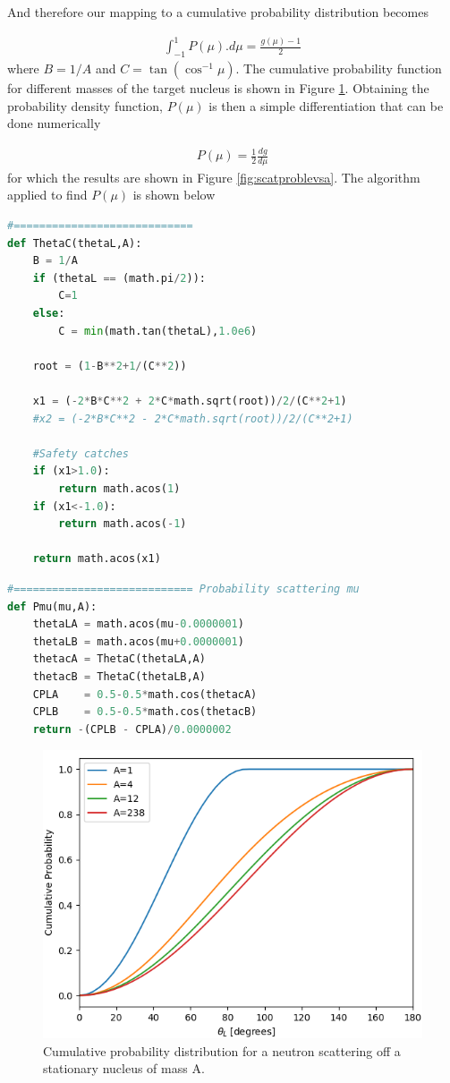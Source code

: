 \documentclass[11pt,letterpaper,titlepage]{article}
\newcommand{\beqn}{\begin{equation}
	\begin{aligned}}
\newcommand{\eeqn}{\end{aligned}
	\end{equation}}
\numberwithin{equation}{section}
\begin{document}
\begin{appendices}
 And therefore our mapping to a cumulative probability distribution becomes
 
 \beqn 
\int_{-1}^1 P(\mu).d\mu = \frac{g(\mu)-1}{2} 
 \eeqn 
 where $B{=}1/A$ and $C{=} \tan ( \cos^{-1} \mu)$. The cumulative probability function for different masses of the target nucleus is shown in Figure \ref{fig:scatanglevsa}. Obtaining the probability density function, $P(\mu)$ is then a simple differentiation that can be done numerically 
 
\beqn
P(\mu)=\frac{1}{2} \frac{dg}{d\mu}
\eeqn  
for which the results are shown in Figure \ref{fig:scatproblevsa}. The algorithm applied to find $P(\mu)$ is shown below

\begin{lstlisting}[language=python]
#============================
def ThetaC(thetaL,A):
    B = 1/A
    if (thetaL == (math.pi/2)):
        C=1
    else:
        C = min(math.tan(thetaL),1.0e6)
    
    root = (1-B**2+1/(C**2))
    
    x1 = (-2*B*C**2 + 2*C*math.sqrt(root))/2/(C**2+1)
    #x2 = (-2*B*C**2 - 2*C*math.sqrt(root))/2/(C**2+1)
    
    #Safety catches
    if (x1>1.0):
        return math.acos(1)
    if (x1<-1.0):
        return math.acos(-1)
    
    return math.acos(x1)
\end{lstlisting}

\newpage
\begin{lstlisting}[language=python]
#============================ Probability scattering mu
def Pmu(mu,A):
    thetaLA = math.acos(mu-0.0000001)
    thetaLB = math.acos(mu+0.0000001)
    thetacA = ThetaC(thetaLA,A)
    thetacB = ThetaC(thetaLB,A)
    CPLA    = 0.5-0.5*math.cos(thetacA)
    CPLB    = 0.5-0.5*math.cos(thetacB)
    return -(CPLB - CPLA)/0.0000002
\end{lstlisting}



\begin{figure}[H]
\centering
\includegraphics[width=0.7\linewidth]{ScatAnglevsA}
\caption{Cumulative probability distribution for a neutron scattering off a stationary nucleus of mass A.}
\label{fig:scatanglevsa}
\end{figure}


\end{appendices}
\end{document}
